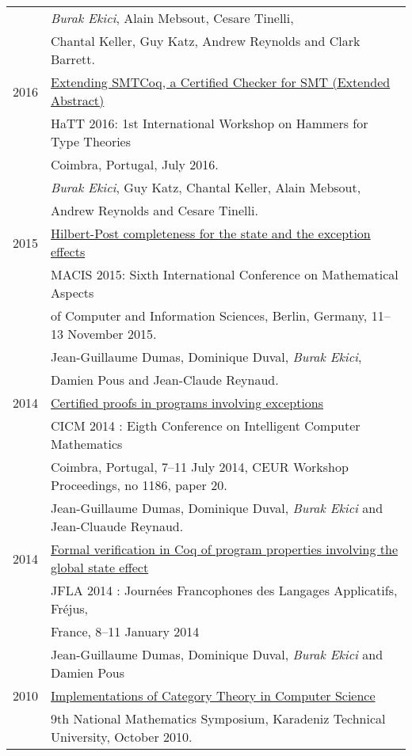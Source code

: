 \documentclass[a4paper,9pt]{article} %
\begin{document}
\begin{longtable}{ll}
& \emph{Burak Ekici}, Alain Mebsout, Cesare Tinelli,\\
& Chantal Keller, Guy Katz, Andrew Reynolds and Clark Barrett. 
 \\[0.20cm]
2016 & {\href{http://eptcs.web.cse.unsw.edu.au/paper.cgi?HaTT2016.5}{Extending SMTCoq, a Certified Checker for SMT (Extended Abstract)}} \\
& HaTT 2016: 1st International Workshop on Hammers for Type Theories\\
& Coimbra, Portugal, July 2016.\\
& \emph{Burak Ekici}, Guy Katz, Chantal Keller, Alain Mebsout,\\
& Andrew Reynolds and Cesare Tinelli.
 \\[0.20cm]
2015& \href{https://hal.archives-ouvertes.fr/hal-01121924}{Hilbert-Post completeness for the state and the exception effects}\\
& MACIS 2015: Sixth International Conference on Mathematical Aspects\\
& of Computer and Information Sciences, Berlin,
Germany, 11–13 November 2015.\\
& Jean-Guillaume Dumas, Dominique Duval, \emph{Burak Ekici}, \\
& Damien Pous and Jean-Claude Reynaud. 
 \\[0.20cm]
2014 & \href{https://hal.archives-ouvertes.fr/hal-00867237}{Certified proofs in programs involving exceptions}\\
& CICM 2014 : Eigth Conference on Intelligent Computer Mathematics \\
& Coimbra, Portugal, 7--11 July 2014, {CEUR Workshop Proceedings, no 1186, paper 20. }\\
&  Jean-Guillaume Dumas, Dominique Duval, \emph{Burak Ekici} and Jean-Cluaude Reynaud.
 \\[0.20cm]
2014 & {\href{https://hal.archives-ouvertes.fr/hal-00869230}{Formal verification in Coq of program properties involving the global state effect}}\\
& JFLA 2014 : Journées Francophones des Langages Applicatifs, Fréjus,\\
& France, 8--11 January 2014\\
&  Jean-Guillaume Dumas, Dominique Duval, \emph{Burak Ekici} and Damien Pous
 \\[0.20cm]
2010 & \href{http://ekiciburak.github.io/}{Implementations of Category Theory in Computer Science}\\
& 9th National Mathematics Symposium, Karadeniz Technical University, October 2010.\\

\end{longtable}
\end{document}
